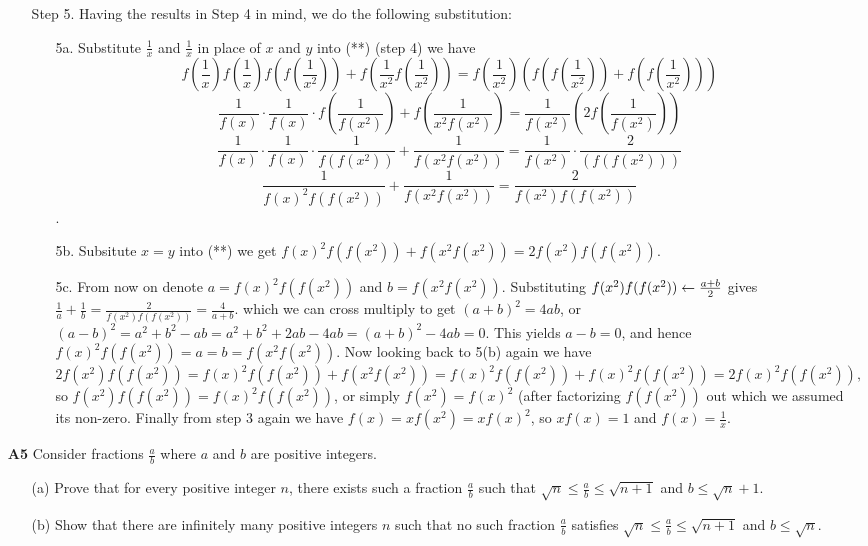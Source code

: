 \documentclass[11pt,a4paper]{article}
\begin{document}
\begin{itemize}
\begin{itemize}
\item [Step 5.]
Having the results in Step 4 in mind, we do the following substitution: 
\begin{itemize}
\item [5a.]
Substitute $\frac 1x$ and $\frac 1x$ in place of $x$ and $y$ into (**) (step 4) we have
$$f\left(\frac 1x\right)f\left(\frac 1x\right)f\left(f\left(\frac 1{x^2}\right)\right) + f\left(\frac 1{x^2}f\left(\frac 1{x^2}\right)\right)
= f\left(\frac 1{x^2}\right) \left(f\left(f\left(\frac 1{x^2}\right)\right) + f\left(f\left(\frac 1{x^2}\right)\right)\right)$$
\[\frac1{f(x)}\cdot \frac1{f(x)}\cdot f\left(\frac 1{f(x^2)}\right)+f\left(\frac 1{x^2f(x^2)}\right)
=\frac1{f(x^2)}\left(2f\left(\frac 1{f(x^2)}\right)\right)\]
\[\frac1{f(x)}\cdot \frac1{f(x)}\cdot \frac 1{f\left(f(x^2)\right)}+\frac 1{f\left(x^2f(x^2)\right)}
=\frac1{f(x^2)}\cdot \frac 2{\left(f\left(f(x^2)\right)\right)}\]
\[\frac 1{f(x)^2 f(f(x^2))}+ \frac 1{f(x^2f(x^2))}
= \frac 2{f(x^2)f(f(x^2))}\]. 
\item [5b.]
Subsitute $x=y$ into (**) we get 
$f(x)^2f(f(x^2)) + f(x^2f(x^2)) = 2f(x^2) f(f(x^2)).$
\item [5c.]
From now on denote $a=f(x)^2f(f(x^2))$ and $b=f(x^2f(x^2))$. 
Substituting $f(x^2) f(f(x^2))\la \frac{a + b} 2$ gives 
$\frac 1{a}+ \frac 1{b}=\frac 2{f(x^2)f(f(x^2))}=\frac 4{a+b}.$
which we can cross multiply to get 
$(a+b)^2=4ab$, or $(a-b)^2=a^2+b^2-ab=a^2+b^2+2ab-4ab=(a+b)^2-4ab=0$. 
This yields $a-b=0$, and hence 
$f(x)^2f(f(x^2))=a=b=f(x^2f(x^2))$. 
Now looking back to 5(b) again we have 
$2f(x^2) f(f(x^2)) = f(x)^2f(f(x^2)) + f(x^2f(x^2)) = f(x)^2f(f(x^2)) + f(x)^2f(f(x^2))=2f(x)^2f(f(x^2)),$ 
so $f(x^2) f(f(x^2))=f(x)^2 f(f(x^2))$, or simply 
$f(x^2)=f(x)^2$ (after factorizing $f(f(x^2))$ out which we assumed its non-zero. 
Finally from step 3 again we have 
$f(x)=xf(x^2)=xf(x)^2$, so $xf(x)=1$ and $f(x)=\frac 1x$. 

\end{itemize}
\end{itemize}

\newpage
\item[\textbf{A5}]
Consider fractions $\frac{a}{b}$ where $a$ and $b$ are positive integers.
\begin{itemize}
\item[(a)]
Prove that for every positive integer $n$, there exists such a fraction $\frac{a}{b}$ such that $\sqrt{n} \le \frac{a}{b} \le \sqrt{n+1}$ and $b \le \sqrt{n}+1$.
\item[(b)]
Show that there are infinitely many positive integers $n$ such that no such fraction $\frac{a}{b}$ satisfies $\sqrt{n} \le \frac{a}{b} \le \sqrt{n+1}$ and $b \le \sqrt{n}$. 
\end{itemize}


\end{itemize}
\end{document}

